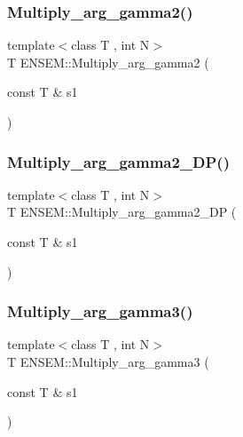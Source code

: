 \mbox{\label{namespaceENSEM_a04d25124568b0f6dfc2f0cfe608d8143}} 
\subsubsection{\texorpdfstring{Multiply\_arg\_gamma2()}{Multiply\_arg\_gamma2()}}
{\footnotesize\ttfamily template$<$class T , int N$>$ \\
T E\+N\+S\+E\+M\+::\+Multiply\+\_\+arg\+\_\+gamma2 (\begin{DoxyParamCaption}\item[{const T \&}]{s1 }\end{DoxyParamCaption})\hspace{0.3cm}{\ttfamily [inline]}}

\mbox{\label{namespaceENSEM_acd7a14ccd822e91b8aed95356a6bf37c}} 
\subsubsection{\texorpdfstring{Multiply\_arg\_gamma2\_DP()}{Multiply\_arg\_gamma2\_DP()}}
{\footnotesize\ttfamily template$<$class T , int N$>$ \\
T E\+N\+S\+E\+M\+::\+Multiply\+\_\+arg\+\_\+gamma2\+\_\+\+DP (\begin{DoxyParamCaption}\item[{const T \&}]{s1 }\end{DoxyParamCaption})\hspace{0.3cm}{\ttfamily [inline]}}

\mbox{\label{namespaceENSEM_ac8f8de88f467fc3d60ac735a9fc90e08}} 
\subsubsection{\texorpdfstring{Multiply\_arg\_gamma3()}{Multiply\_arg\_gamma3()}}
{\footnotesize\ttfamily template$<$class T , int N$>$ \\
T E\+N\+S\+E\+M\+::\+Multiply\+\_\+arg\+\_\+gamma3 (\begin{DoxyParamCaption}\item[{const T \&}]{s1 }\end{DoxyParamCaption})\hspace{0.3cm}{\ttfamily [inline]}}

